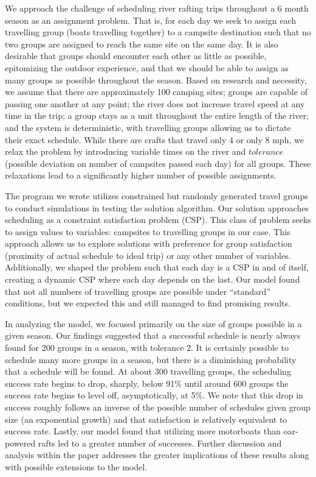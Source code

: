 \documentclass[11pt]{article} %
\begin{document}
We approach the challenge of scheduling river rafting trips throughout a 6
month season as an assignment problem.  That is, for each day we seek to
assign each travelling group (boats travelling together) to a campsite
destination such that no two groups are assigned to reach the same site on
the same day.  It is also desirable that groups should encounter each other
as little as possible, epitomizing the outdoor experience, and that we
should be able to assign as many groups as possible throughout the season.
Based on research and necessity, we assume that there are approximately 100
camping sites; groups are capable of passing one another at any point; the
river does not increase travel speed at any time in the trip; a group stays
as a unit throughout the entire length of the river; and the system is
deterministic, with travelling groups allowing us to dictate their exact
schedule.  While there are crafts that travel only 4 or
only 8 mph, we relax the problem by introducing variable times on the river
and $tolerance$ (possible deviation on number of campsites passed each
day) for all groups.  These relaxations lead to a significantly higher
number of possible assignments.

The program we wrote utilizes constrained but randomly generated travel
groups to conduct simulations in testing the solution algorithm.  Our
solution approaches scheduling as a constraint satisfaction problem (CSP).
This class of problem seeks to assign values to variables: campsites to
travelling groups in our case.  This approach allows us to explore solutions
with preference for group satisfaction (proximity of actual schedule to
ideal trip) or any other number of variables.  Additionally, we shaped the
problem such that each day is a CSP in and of itself, creating a dynamic CSP
where each day depends on the last.  Our model found that not all numbers of
travelling groups are possible under ``standard'' conditions, but we expected
this and still managed to find promising results.

In analyzing the model, we focused primarily on the size of groups possible
in a given season.  Our findings suggested that a successful schedule is nearly
always found for 200 groups in a season, with tolerance 2.  It is certainly
possible to schedule many more groups in a season, but there is a diminishing
probability that a schedule will be found.  At about 300 travelling groups,
the scheduling success rate begins to drop, sharply, below 91\% until
around 600 groups the success rate begins to level off, asymptotically, at
5\%.  We note that this drop in success roughly follows an inverse of the
possible number of schedules given group size (an exponential growth) and
that satisfaction is relatively equivalent to success rate.  Lastly, our
model found that utilizing more motorboats than oar-powered rafts led to a
greater number of successes.  Further discussion and analysis within the
paper addresses the greater implications of these results along with possible
extensions to the model.
\end{document}
